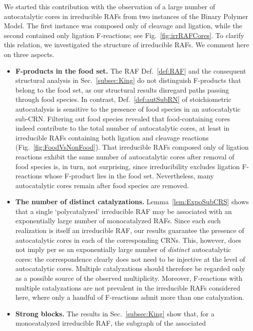 \documentclass[pdflatex]{sn-jnl}
\theoremstyle{thmstyleone}%
\theoremstyle{examplesty}%
\theoremstyle{thmstylethree}%
\newcommand{\PFS}[1]{\begingroup\color{cyan}#1\endgroup}
\begin{document}
We started this contribution with the observation of a large number of
autocatalytic cores in irreducible RAFs from two instances of the Binary
Polymer Model. The first instance was composed only of cleavage and
ligation, while the second contained only ligation F-reactions; see
Fig.~\ref{fig:irrRAFCores}. To clarify this relation, we investigated the
structure of irreducible RAFs. We comment here on three aspects.
\begin{itemize}
\item \textbf{F-products in the food set.} The RAF Def.~\ref{def:RAF} and
  the consequent structural analysis in Sec.~\ref{subsec:King} do not
  distinguish F-products that belong to the food set, as our structural
  results disregard paths passing through food species. In contrast,
  Def.~\ref{def:autSubRN} of stoichiometric autocatalysis is sensitive to
  the presence of food species in an autocatalytic sub-CRN. Filtering out
  food species revealed that food-containing cores indeed contribute to the
  total number of autocatalytic cores, at least in irreducible RAFs
  containing both ligation and cleavage reactions
  (Fig.~\ref{fig:FoodVsNonFood}). That irreducible RAFs composed only of
  ligation reactions exhibit the same number of autocatalytic cores after
  removal of food species is, in turn, not surprising, since irreducibility
  excludes ligation F-reactions whose F-product lies in the food
  set. Nevertheless, many autocatalytic cores remain after food species are
  removed.
\item \textbf{The number of distinct catalyzations.}
  Lemma~\ref{lem:ExpoSubCRS} shows that a single `polycatalyzed'
  irreducible RAF may be associated with an exponentially large number of
  monocatalyzed RAFs. Since each such realization is itself an irreducible
  RAF, our results guarantee the presence of autocatalytic cores in each of
  the corresponding CRNs. This, however, does not imply per se an
  exponentially large number of \emph{distinct} autocatalytic cores: the
  correspondence clearly \PFS{does not need to be} injective at the level
  of autocatalytic cores. Multiple catalyzations should therefore be
  regarded only as a possible source of the observed
  multiplicity. Moreover, F-reactions with multiple catalyzations are not
  prevalent in the irreducible RAFs considered here, where only a handful
  of F-reactions admit more than one catalyzation.
\item \textbf{Strong blocks.} The results in Sec.~\ref{subsec:King} show
  that, for a monocatalyzed irreducible RAF, the subgraph of the associated

\end{itemize}
\end{document}
